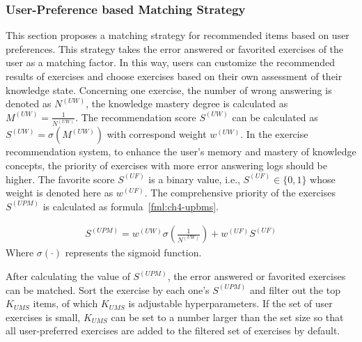 \subsubsection{User-Preference based Matching Strategy}


This section proposes a matching strategy for recommended items based on user preferences. This strategy takes the error answered or favorited exercises of the user as a matching factor. In this way, users can customize the recommended results of exercises and choose exercises based on their own assessment of their knowledge state. Concerning one exercise, the number of wrong answering is denoted as \(N^{(UW)}\), the knowledge mastery degree is calculated as \(M^{(UW)}=\frac{1}{N^{(UW)}}\). The recommendation score \(S^{(UW)}\) can be calculated as \(S^{(UW)}=\sigma(M^{(UW)}) \)  with correspond weight \(w^{(UW)}\). In the exercise recommendation system, to enhance the user's memory and mastery of knowledge concepts, the priority of exercises with more error answering logs should be higher. The favorite score \(S^{(UF)}\) is a binary value, i.e., \(S^{(UF)}\in \{0,1\} \) whose weight is denoted here as \(w^{(UF)}\). The comprehensive priority of the exercises \(S^{(UPM)}\) is calculated as formula~\ref{fml:ch4-upbms}.

\begin{align}
    S^{(UPM)} = w^{(UW)}\sigma({\frac{1}{N^{(UW)}}}) + w^{(UF)}S^{(UF)} \label{fml:ch4-upbms}
\end{align}
Where \(\sigma(\cdot)\) represents the sigmoid function.

After calculating the value of \(S^{(UPM)}\), the error answered or favorited exercises can be matched. Sort the exercise by each one's \(S^{(UPM)}\) and filter out the top \(K_{UMS}\) items, of which \(K_{UMS}\) is adjustable hyperparameters. If the set of user exercises is small, \(K_{UMS}\) can be set to a number larger than the set size so that all user-preferred exercises are added to the filtered set of exercises by default.

